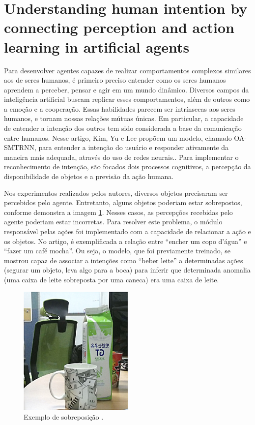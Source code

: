 \section{Understanding human intention by connecting perception and action learning in artificial agents \cite{kim2017understanding}}

Para desenvolver agentes capazes de realizar comportamentos complexos similares aos de seres humanos, é primeiro preciso entender como os seres humanos aprendem a perceber, pensar e agir em um mundo dinâmico. Diversos campos da inteligência artificial buscam replicar esses comportamentos, além de outros como a emoção e a cooperação. Essas habilidades parecem ser intrínsecas aos seres humanos, e tornam nossas relações mútuas únicas. Em particular, a capacidade de entender a intenção dos outros tem sido considerada a base da comunicação entre humanos. Nesse artigo, Kim, Yu e Lee propõem um modelo, chamado OA-SMTRNN, para entender a intenção do usuário e responder ativamente da maneira mais adequada, através do uso de redes neurais.. Para implementar o reconhecimento de intenção, são focados dois processos cognitivos, a percepção da disponibilidade de objetos e a previsão da ação humana.

Nos experimentos realizados pelos autores, diversos objetos precisaram ser percebidos pelo agente. Entretanto, alguns objetos poderiam estar sobrepostos, conforme demonstra a imagem \ref{fig:overlap}. Nesses casos, as percepções recebidas pelo agente poderiam estar incorretas. Para resolver este problema, o módulo responsável pelas ações foi implementado com a capacidade de relacionar a ação e os objetos. No artigo, é exemplificada a relação entre ``encher um copo d'água'' e ``fazer um café mocha''. Ou seja, o modelo, que foi previamente treinado, se mostrou capaz de associar a intenções como ``beber leite'' a determinadas ações (segurar um objeto, leva algo para a boca) para inferir que determinada anomalia (uma caixa de leite sobreposta por uma caneca) era uma caixa de leite.

\begin{figure}
    \centering
    \includegraphics[width=0.5\textwidth]{Images/overlap.jpg}
    \caption{Exemplo de sobreposição \cite{kim2017understanding}.}
    \label{fig:overlap}
\end{figure}


